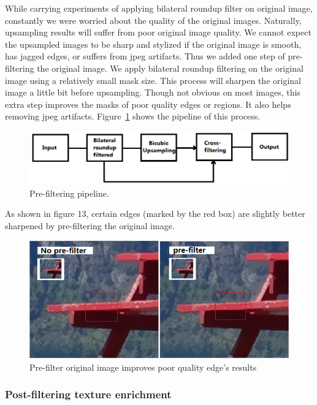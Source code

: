 While carrying experiments of applying bilateral roundup filter on original image, constantly we were worried about the quality of the original images. Naturally, upsampling results will suffer from poor original image quality. We cannot expect the upsampled images to be sharp and stylized if the original image is smooth, has jagged edges, or suffers from jpeg artifacts. Thus we added one step of pre-filtering the original image. We apply bilateral roundup filtering on the original image using a relatively small mask size. This process will sharpen the original image a little bit before upsampling. Though not obvious on most images, this extra step improves the masks of poor quality edges or regions. It also helps removing jpeg artifacts. Figure~\ref{fig:prefiltering} shows the pipeline of this process.

\begin{figure}[htbp]
\includegraphics[width=1.0\textwidth]{f12}
\caption{Pre-filtering pipeline.}
\label{fig:prefiltering}
\end{figure}
As shown in figure 13, certain edges (marked by the red box) are slightly better sharpened by pre-filtering the original image.
\begin{figure}[htbp]
\includegraphics[width=1.0\textwidth]{f13}
\caption{Pre-filter original image improves poor quality edge's results}
\end{figure}

\subsubsection{Post-filtering texture enrichment}

